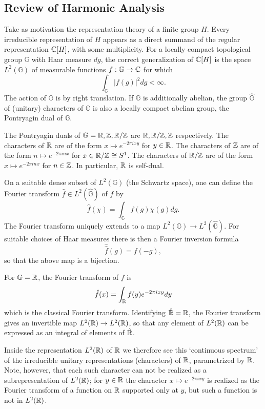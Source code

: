 \subsection{Review of Harmonic Analysis}

Take as motivation the representation theory of a finite group $H$. Every irreducible representation of $H$ appears as a direct summand of the regular representation $\mathbb{C}[H]$, with some multiplicity. For a locally compact topological group $\mathbb G$ with Haar measure $dg$, the correct generalization of $\mathbb{C}[H]$ is the space $L^2(\mathbb G)$ of measurable functions $f:\mathbb G \to \mathbb{C}$ for which 
$$\int_{\mathbb G} |f(g)|^2 dg < \infty.$$
The action of $\mathbb G$ is by right translation. If $\mathbb G$ is additionally abelian, the group $\hat{\mathbb G}$ of (unitary) characters of $\mathbb G$ is also a locally compact abelian group, the Pontryagin dual of $\mathbb G$. 

\begin{example}
    The Pontryagin duals of $\mathbb G = \mathbb{R}, \mathbb{Z}, \mathbb{R}/\mathbb{Z}$ are $\mathbb{R}, \mathbb{R}/\mathbb{Z}, \mathbb{Z}$ respectively. The characters of $\mathbb{R}$ are of the form $x \mapsto e^{-2\pi i xy}$ for $y \in \mathbb{R}$. The characters of $\mathbb{Z}$ are of the form $n \mapsto e^{-2\pi i nx}$ for $x \in \mathbb{R}/\mathbb{Z} \cong S^1$. The characters of $\mathbb{R}/\mathbb{Z}$ are of the form $x \mapsto e^{-2\pi i nx}$ for $n \in \mathbb{Z}$. In particular, $\mathbb{R}$ is self-dual.
\end{example}

On a suitable dense subset of $L^2(\mathbb G)$ (the Schwartz space), one can define the Fourier transform $\hat{f} \in L^2(\hat{\mathbb G})$ of $f$ by
$$\hat{f}(\chi) = \int_{\mathbb G} f(g)\chi(g) dg.$$
The Fourier transform uniquely extends to a map $L^2(\mathbb G) \to L^2(\hat{\mathbb G})$. For suitable choices of Haar measures there is then a Fourier inversion formula 
$$\hat{\hat{f}}(g)=f(-g),$$ so that the above map is a bijection.

\begin{example}
    For $\mathbb G=\mathbb{R}$, the Fourier transform of $f$ is 
    $$\hat{f}(x) = \int_{\mathbb{R}} f(y)e^{-2\pi i xy} dy$$
    which is the classical Fourier transform. Identifying $\hat{\mathbb{R}} = \mathbb{R}$, the Fourier transform gives an invertible map $L^2(\mathbb{R}) \to L^2(\mathbb{R})$, so that any element of $L^2(\mathbb{R})$ can be expressed as an integral of elements of $\hat{\mathbb{R}}$. 

    Inside the representation $L^2(\mathbb{R})$ of $\mathbb{R}$ we therefore see this `continuous spectrum' of the irreducible unitary representations (characters) of $\mathbb{R}$, parametrized by $\mathbb{R}$. Note, however, that each such character can not be realized as a subrepresentation of $L^2(\mathbb{R})$; for $y \in \mathbb{R}$ the character $x \mapsto e^{-2\pi i xy}$ is realized as the Fourier transform of a function on $\mathbb{R}$ supported only at $y$, but such a function is not in $L^2(\mathbb{R})$.
\end{example}

